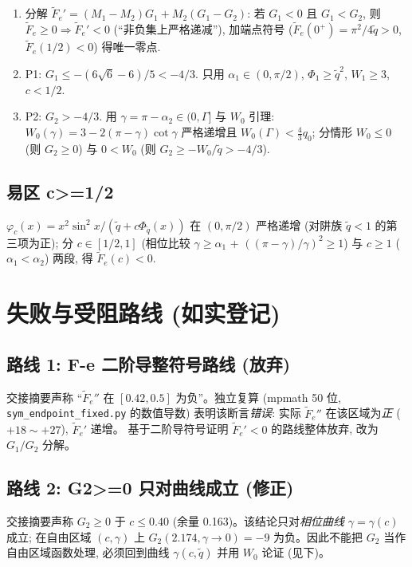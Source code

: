 \documentclass[UTF8]{ctexart}
\begin{document}
\begin{enumerate}
	\item 分解 $\widetilde F_e'=(M_1-M_2)G_1+M_2(G_1-G_2)$: 若 $G_1<0$ 且
		$G_1<G_2$, 则 $\widetilde F_e\ge0\Rightarrow\widetilde F_e'<0$
		(``非负集上严格递减''), 加端点符号 ($\widetilde F_e(0^+)=\pi^2/4\tilde q>0$,
		$\widetilde F_e(1/2)<0$) 得唯一零点.
	\item P1: $G_1\le-(6\sqrt6-6)/5<-4/3$. 只用
		$\alpha_1\in(0,\pi/2)$, $\Phi_1\ge\tilde q^2$, $W_1\ge3$, $c<1/2$.
	\item P2: $G_2>-4/3$. 用 $\gamma=\pi-\alpha_2\in(0,\Gamma]$ 与 $W_0$ 引理:
		$W_0(\gamma)=3-2(\pi-\gamma)\cot\gamma$ 严格递增且
		$W_0(\Gamma)<\frac43q_0$; 分情形 $W_0\le0$ (则 $G_2\ge0$) 与
		$0<W_0$ (则 $G_2\ge-W_0/\tilde q>-4/3$).
\end{enumerate}

\subsection{易区 c>=1/2}

$\varphi_c(x)=x^2\sin^2x/(\tilde q+c\Phi_{\tilde q}(x))$ 在 $(0,\pi/2)$ 严格递增
(对阱族 $\tilde q<1$ 的第三项为正); 分 $c\in[1/2,1]$ (相位比较 $\gamma\ge\alpha_1$
+ $((\pi-\gamma)/\gamma)^2\ge1$) 与 $c\ge1$ ($\alpha_1<\alpha_2$) 两段, 得
$\widetilde F_e(c)<0$.

\section{失败与受阻路线 (如实登记)}\label{sec:failed}

\subsection{路线 1: F-e 二阶导整符号路线 (放弃)}

交接摘要声称 ``$\widetilde F_e''$ 在 $[0.42,0.5]$ 为负''。独立复算 (mpmath 50 位,
\texttt{sym\_endpoint\_fixed.py} 的数值导数) 表明该断言\emph{错误}: 实际
$\widetilde F_e''$ 在该区域为\emph{正} ($+18\sim+27$), $\widetilde F_e'$ 递增。
基于二阶导符号证明 $\widetilde F_e'<0$ 的路线整体放弃, 改为 $G_1/G_2$ 分解。

\subsection{路线 2: G2>=0 只对曲线成立 (修正)}

交接摘要声称 $G_2\ge0$ 于 $c\le0.40$ (余量 0.163)。该结论只对\emph{相位曲线}
$\gamma=\gamma(c)$ 成立; 在自由区域 $(c,\gamma)$ 上 $G_2(2.174,\gamma\to0)=-9$
为负。因此不能把 $G_2$ 当作自由区域函数处理, 必须回到曲线 $\gamma(c,\tilde q)$ 并用
$W_0$ 论证 (见下)。
\end{document}
